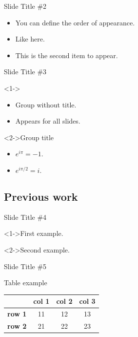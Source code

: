 \documentclass{beamer}
\begin{document}
\begin{frame}{Slide Title \#2}
	\begin{itemize}
		\item <1->You can define the order of appearance.
		\item <3->Like here.
		\item <2->This is the second item to appear.
	\end{itemize}
\end{frame}

\begin{frame}{Slide Title \#3}
	\begin{block}
		<1->{}
		\begin{itemize}
			\item Group without title.
			\item Appears for all slides.
		\end{itemize}
	\end{block}
	\begin{exampleblock}
		<2->{Group title}
		\begin{itemize}
			\item $e^{i\pi}=-1$.
			\item $e^{i\pi/2}=i$.
		\end{itemize}
	\end{exampleblock}
\end{frame}

\subsection{Previous work}

\begin{frame}{Slide Title \#4}
	\begin{example}
		<1->First example. 
	\end{example}
	\begin{example}
		<2->Second example.
	\end{example}
\end{frame}

\begin{frame}{Slide Title \#5}
	\begin{center}
		Table example \\[12pt]
		\begin{tabular}{c||c|c|c|}
			& \textbf{col 1} & \textbf{col  2} & \textbf{col 3} \\
			\hline
			\hline
			\textbf{row 1} & 11 & 12 & 13 \\
			\hline
			\textbf{row 2} & 21 & 22 & 23 \\
		\end{tabular}
    \end{center}
\end{frame}
\end{document}
